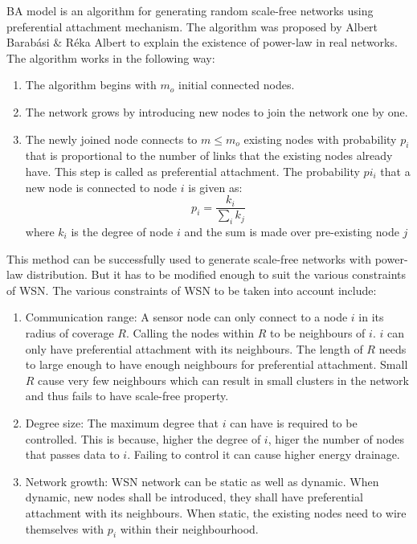 \documentclass{article}
\begin{document}
BA model is an algorithm for generating random scale-free networks using preferential attachment mechanism. The algorithm was proposed by Albert Barab{\'a}si \& R{\'e}ka Albert to explain the existence of power-law in real networks. The algorithm works in the following way:
\begin{enumerate}
\item The algorithm begins with $m_o$ initial connected nodes.
\item The network grows by introducing new nodes to join the network one by one. 
\item The newly joined node connects to $m \leq m_o$ existing nodes with probability $p_i$ that is proportional to the number of links that the existing nodes already have. This step is called as preferential attachment. The probability $pi_i$ that a new node is connected to node $i$ is given as:
		\begin{equation}
		p_i = \frac{k_i}{\sum_i{k_j}}
		\end{equation}
where $k_i$ is the degree of node $i$ and the sum is made over pre-existing node $j$
\end{enumerate}
This method can be successfully used to generate scale-free networks with power-law distribution. But it has to be modified enough to suit the various constraints of WSN. The various constraints of WSN to be taken into account include: 
\begin{enumerate}
\item Communication range: A sensor node can only connect to a node $i$ in its radius of coverage $R$. Calling the nodes within $R$ to be neighbours of $i$. $i$ can only have preferential attachment with its neighbours. The length of $R$ needs to large enough to have enough neighbours for preferential attachment. Small $R$ cause very few neighbours which can result in small clusters in the network and thus fails to have scale-free property.
\item Degree size: The maximum degree that $i$ can have is required to be controlled. This is because, higher the degree of $i$, higer the number of nodes that passes data to $i$. Failing to control it can cause higher energy drainage. 
\item Network growth: WSN network can be static as well as dynamic. When dynamic, new nodes shall be introduced, they shall have preferential attachment with its neighbours. When static, the existing nodes need to wire themselves with $p_i$ within their neighbourhood.
\end{enumerate}
\end{document}
